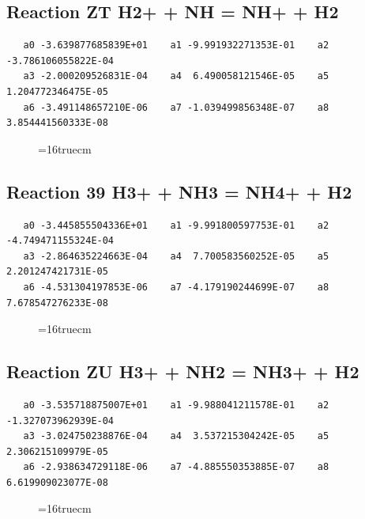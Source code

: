 \documentclass[12pt]{article}
\begin{document}
\subsection{
Reaction ZT H2+ + NH = NH+ + H2}
\begin{small}\begin{verbatim}
   a0 -3.639877685839E+01    a1 -9.991932271353E-01    a2 -3.786106055822E-04
   a3 -2.000209526831E-04    a4  6.490058121546E-05    a5  1.204772346475E-05
   a6 -3.491148657210E-06    a7 -1.039499856348E-07    a8  3.854441560333E-08
   \end{verbatim}\end{small}
\begin{figure}[h!] \label{n2rates}
\epsfxsize=16truecm
\end{figure}
\newpage

\subsection{
Reaction 39 H3+ + NH3 = NH4+ + H2}
\begin{small}\begin{verbatim}
   a0 -3.445855504336E+01    a1 -9.991800597753E-01    a2 -4.749471155324E-04
   a3 -2.864635224663E-04    a4  7.700583560252E-05    a5  2.201247421731E-05
   a6 -4.531304197853E-06    a7 -4.179190244699E-07    a8  7.678547276233E-08
   \end{verbatim}\end{small}
\begin{figure}[h!] \label{n2rates}
\epsfxsize=16truecm
\end{figure}
\newpage

\subsection{
Reaction ZU H3+ + NH2 = NH3+ + H2}
\begin{small}\begin{verbatim}
   a0 -3.535718875007E+01    a1 -9.988041211578E-01    a2 -1.327073962939E-04
   a3 -3.024750238876E-04    a4  3.537215304242E-05    a5  2.306215109979E-05
   a6 -2.938634729118E-06    a7 -4.885550353885E-07    a8  6.619909023077E-08
   \end{verbatim}\end{small}
\begin{figure}[h!] \label{n2rates}
\epsfxsize=16truecm
\end{figure}
\newpage
\end{document}
